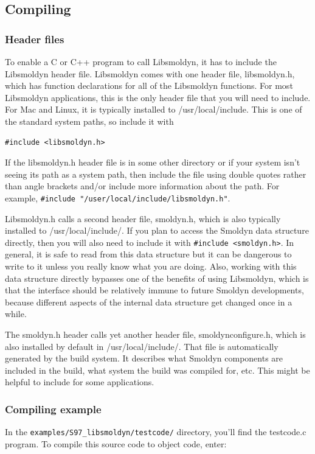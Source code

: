 \documentclass {book}
\newcommand {\ttt} {\texttt}
\begin{document}
\subsection*{Compiling}

\subsubsection*{Header files}
To enable a C or C++ program to call Libsmoldyn, it has to include the Libsmoldyn header file. Libsmoldyn comes with one header file, libsmoldyn.h, which has function declarations for all of the Libsmoldyn functions. For most Libsmoldyn applications, this is the only header file that you will need to include. For Mac and Linux, it is typically installed to /usr/local/include. This is one of the standard system paths, so include it with

\begin{lstlisting}[style=SSAC]
#include <libsmoldyn.h>
\end{lstlisting}

If the libsmoldyn.h header file is in some other directory or if your system isn't seeing its path as a system path, then include the file using double quotes rather than angle brackets and/or include more information about the path. For example, \lstinline{#include "/user/local/include/libsmoldyn.h"}.

Libsmoldyn.h calls a second header file, smoldyn.h, which is also typically installed to /usr/local/include/. If you plan to access the Smoldyn data structure directly, then you will also need to include it with \lstinline{#include <smoldyn.h>}. In general, it is safe to read from this data structure but it can be dangerous to write to it unless you really know what you are doing. Also, working with this data structure directly bypasses one of the benefits of using Libsmoldyn, which is that the interface should be relatively immune to future Smoldyn developments, because different aspects of the internal data structure get changed once in a while.

The smoldyn.h header calls yet another header file, smoldynconfigure.h, which is also installed by default in /usr/local/include/. That file is automatically generated by the build system. It describes what Smoldyn components are included in the build, what system the build was compiled for, etc. This might be helpful to include for some applications.

\subsubsection*{Compiling example}
In the \ttt{examples/S97\_libsmoldyn/testcode/} directory, you'll find the testcode.c program. To compile this source code to object code, enter:
\end{document}
